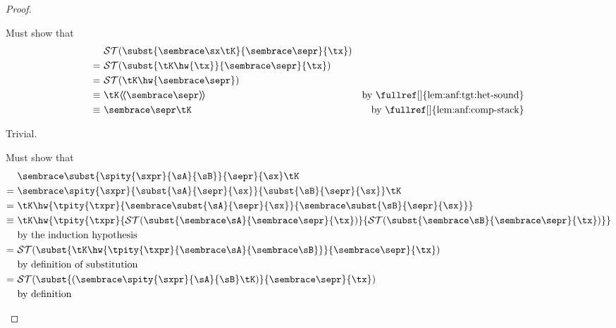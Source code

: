 {\begin{proof}
\begin{proofcases}
      Must show that \im{\anf{\sepr}{\tK} \equiv \sbound{\subst{(\anf{\sx}{\tK})}{\anfh{\sepr}}{\tx}}}
      \begin{align}
        & \sbound{\subst{\anf{\sx}{\tK}}{\anfh{\sepr}}{\tx}} \nonumber \\
        =~& \sbound{\subst{\tK\hw{\tx}}{\anfh{\sepr}}{\tx}} \\
        =~& \sbound{\tK\hw{\anfh{\sepr}}} \\
        \equiv~& \tK\hhw{\anfh{\sepr}} & \text{by \fullref[]{lem:anf:tgt:het-sound}} \\
        \equiv~& \anf{\sepr}{\tK} & \text{by \fullref[]{lem:anf:comp-stack}}
      \end{align}

    \item \im{\se = \spropty}
      Trivial.

    \item \im{\se = \spity{\sxpr}{\sA}{\sB}}

      Must show that
      \im{\anf{\subst{\spity{\sxpr}{\sA}{\sB}}{\sepr}{\sx}}{\tK}
        \equiv
        \sbound{\subst{(\anf{\spity{\sxpr}{\sA}{\sB}}{\tK})}{\anfh{\sepr}}{\sx}}}
      \begin{align}
        & \anf{\subst{\spity{\sxpr}{\sA}{\sB}}{\sepr}{\sx}}{\tK} \nonumber \\
        =~& \anf{\spity{\sxpr}{\subst{\sA}{\sepr}{\sx}}{\subst{\sB}{\sepr}{\sx}}}{\tK} \\
        =~& \tK\hw{\tpity{\txpr}{\anfh{\subst{\sA}{\sepr}{\sx}}}{\anfh{\subst{\sB}{\sepr}{\sx}}}} \\
        \equiv~& \tK\hw{\tpity{\txpr}{\sbound{\subst{\anfh{\sA}}{\anfh{\sepr}}{\tx}}}{\sbound{\subst{\anfh{\sB}}{\anfh{\sepr}}{\tx}}}} \\
        & \text{by the induction hypothesis} \nonumber \\
        =~& \sbound{\subst{\tK\hw{\tpity{\txpr}{\anfh{\sA}}{\anfh{\sB}}}}{\anfh{\sepr}}{\tx}} \\
        & \text{by definition of substitution} \nonumber \\
        =~& \sbound{\subst{(\anf{\spity{\sxpr}{\sA}{\sB}}{\tK})}{\anfh{\sepr}}{\tx}} \\
        & \text{by definition} \nonumber
      \end{align}

    \item \im{\se = \sappe{\seone}{\setwo}}


\end{proofcases}
\end{proof}}
